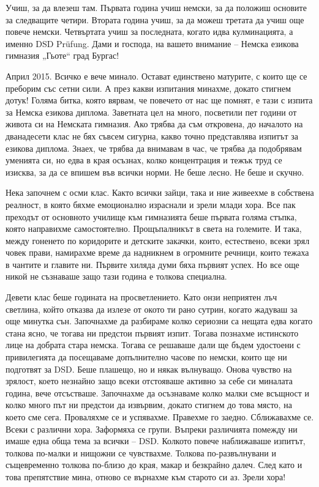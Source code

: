 \begin{multicols}{3}

Учиш, за да влезеш там. Първата година учиш немски, за да положиш основите за 
следващите четири. Втората година учиш, за да можеш третата да учиш още повече 
немски. Четвъртата учиш за последната, когато идва кулминацията, а именно  DSD 
Prüfung. Дами и господа, на вашето внимание – Немска езикова гимназия „Гьоте“ 
град Бургас!

Април 2015. Всичко е вече минало. Остават единствено матурите, с които ще се 
преборим със сетни сили. А през какви изпитания минахме, докато стигнем дотук! 
Голяма битка, която вярвам, че повечето от нас ще помнят, е тази с изпита за 
Немска езикова диплома. Заветната цел на много, посветили пет години от живота 
си на Немската гимназия. Ако трябва да съм  откровена, до началото на 
дванадесети клас не бях съвсем сигурна,  какво точно представлява изпитът за 
езикова диплома. Знаех, че трябва да внимавам в час, че трябва да подобрявам 
уменията си, но едва в края осъзнах, колко концентрация и тежък труд се изисква, 
за да се впишем във всички норми. Не беше лесно. Не беше и скучно. 

Нека започнем с осми клас. Както всички зайци, така и ние живеехме в собствена 
реалност, в която бяхме емоционално израснали и зрели млади хора. Все пак 
преходът от основното училище към гимназията беше първата голяма стъпка, която 
направихме самостоятелно. Прощъпалникът в света на големите. И така, между 
гоненето по коридорите и детските закачки, които, естествено, всеки зрял човек 
прави, намирахме време да надникнем в огромните речници, които тежаха в чантите 
и главите ни. Първите хиляда думи бяха първият успех. Но все още никой не 
съзнаваше защо тази година е толкова специална.

Девети клас беше годината на просветлението. Като онзи неприятен лъч светлина, 
който отказва да излезе от окото ти рано сутрин, когато жадуваш за още минутка 
сън. Започнахме да разбираме колко сериозни са нещата едва когато стана ясно, че 
тогава ни предстои първият изпит. Тогава познахме истинското лице на добрата 
стара немска. Тогава се решаваше дали ще бъдем удостоени с привилегията да 
посещаваме допълнително часове по немски, които ще ни подготвят за DSD. Беше 
плашещо, но и някак вълнуващо. Онова чувство на зрялост, което незнайно защо 
всеки отстояваше активно за себе си миналата година, вече отсъстваше. Започнахме 
да осъзнаваме колко малки сме всъщност и колко много път ни предстои да 
извървим, докато стигнем до това място, на което сме сега. Проваляхме се и 
успявахме. Правехме го заедно. Сближавахме се. Всеки с различни хора. Заформяха 
се групи. Въпреки различията помежду ни имаше една обща тема за всички – DSD. 
Колкото повече наближаваше изпитът, толкова по-малки и нищожни се чувствахме. 
Толкова по-развълнувани и същевременно толкова по-близо до края, макар и 
безкрайно далеч. След като и това препятствие мина, отново се върнахме към 
старото си аз. Зрели хора!


\end{multicols}
